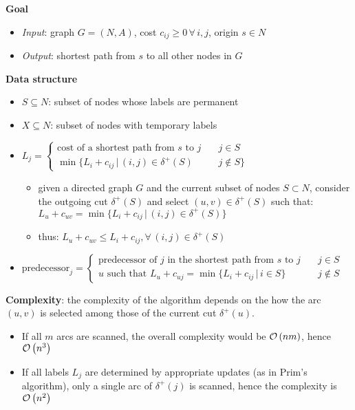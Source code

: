 \documentclass[english]{article}
\begin{document}
\bigskip
\textbf{Goal}
\begin{itemize}[label=\(\rightarrow\)]
  \item \textit{Input}: graph \(G = (N, A)\), cost \(c_{ij} \geq 0 \, \forall \, i, j\), origin \(s \in N\)
  \item \textit{Output}: shortest path from \(s\) to all other nodes in \(G\)
\end{itemize}

\bigskip
\textbf{Data structure}
\begin{itemize}
  \item \(S \subseteq N\): subset of nodes whose labels are permanent
  \item \(X \subseteq N\): subset of nodes with temporary labels
  \item \(L_j = \begin{cases} \text{cost of a shortest path from } s \text{ to } j \quad & j \in S \\ \min\{L_i + c_{ij} \, | \, (i, j) \in \delta^+(S) & j \notin S\}\end{cases}\)
        \begin{itemize}[label=\(\rightarrow\)]
          \item given a directed graph \(G\) and the current subset of nodes \(S \subset N\), consider the outgoing cut \(\delta^+(S)\) and select \((u, v) \in \delta^+(S)\) such that: \( L_u + c_{uv} = \min\{L_i + c_{ij} \, | \, (i, j) \in \delta^+ (S)\}\)
          \item thus: \(L_u + c_{uv} \leq L_i + c_{ij}, \forall \, (i, j) \in \delta^+(S)\)
        \end{itemize}
  \item \(\text{predecessor}_j = \begin{cases}\text{predecessor of } j \text{ in the shortest path from } s \text{ to } j \quad& j \in S \\ u \text{ such that } L_u + c_{uj} = \min\{L_i + c_{ij} \, | \, i \in S\} & j \notin S\end{cases}\)
\end{itemize}

\bigskip
\textbf{Complexity}:
the complexity of the algorithm depends on the how the arc \((u, v)\) is selected among those of the current cut \(\delta^+(u)\).
\begin{itemize}
  \item If all \(m\) arcs are scanned, the overall complexity would be \(\mathcal{O}\left(nm\right)\), hence \(\mathcal{O}\left(n^3\right)\)
  \item If all labels \(L_j\) are determined by appropriate updates (as in Prim's algorithm), only a single arc of \(\delta^+(j)\) is scanned, hence the complexity is \(\mathcal{O}\left(n^2\right)\)
\end{itemize}
\end{document}
